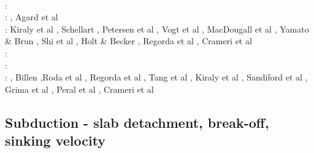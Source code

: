 \begin{scriptsize}
\cite{basc14}\cite{vamd14}\cite{kile14}\cite{jahm14}\cite{bufa14}\cite{bufy14b}\cite{chsv14}
\cite{chsg14}\cite{sigb14}\cite{shjm14}\cite{mova14}\cite{olpr14}\cite{paml14b}\cite{mafv14}\\
\twothousandfifteen: 
\cite{bemm15}\cite{bomv15}\cite{bogf15}\cite{ceag15}\cite{kifr15}\cite{vami15}\cite{dali15}
\cite{mami15}\cite{rula15}\cite{chsd15}\cite{dusc15}\cite{yotr15}\cite{cibi15}\cite{hobb15}
\cite{carr15}\\
\twothousandsixteen: 
\cite{tomy16}\cite{gukt16}\cite{robn16}\cite{mavm16}\cite{magc16}\cite{marl16}\cite{mesj16}
\cite{jada16}\cite{jada16b}\cite{liku16}\cite{chss16}, Agard et al \cite{agys16}\\
\twothousandseventeen: 
Kiraly et al \cite{kicf17}, Schellart \cite{sche17}, Petersen et al \cite{pest17},
Vogt et al \cite{vomc17}, MacDougall et al \cite{majf17}, Yamato \& Brun \cite{yabr17}, 
Shi et al \cite{shwl17}, Holt \& Becker \cite{hobe17}, Regorda et al \cite{rerm17},
Crameri et al \cite{crlt17}\\
\twothousandeighteen: 
\cite{yamz18}\cite{crli18}\cite{spcv18}\cite{chss18}\cite{yagz18}\cite{mazh18}\cite{pukp18}
\cite{masg18}\cite{biar18}\\
\twothousandnineteen:
\cite{magn19}\cite{mavb19}\cite{scvm19}\cite{cakc19}\cite{samo19}\cite{sihf19}\cite{meag19}
\cite{vaws19}\cite{bokg19}\cite{vawg19}\cite{cibi19}\cite{pust19}\\
\twothousandtwenty:
\cite{algg20}\cite{braf20}\cite{vamg20}\cite{dawl20}\cite{meag20}\cite{bedh20}\cite{heyg20}
\cite{kicd20}\cite{mugu20}\cite{gatt20}\cite{pust20}, Billen \cite{bill20},Roda et al \cite{rozr20}, Regorda et al \cite{relr20}, Tang et al \cite{tacm20}, Kiraly et al \cite{kiph20}, Sandiford et al \cite{sams20}, Grima et al \cite{grlc20}, Peral et al \cite{perz20}, Crameri et al \cite{crmd20}
\end{scriptsize}

\subsection{Subduction - slab detachment, break-off, sinking velocity}

